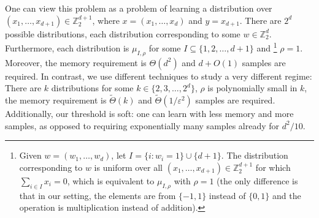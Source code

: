 \documentclass[final, 12pt]{colt2018}
\begin{document}
One can view this problem as a problem of learning a distribution over 
$\left(x_1, \dots, x_{d+1}\right) \in \mathbb{Z}_2^{d+1}$, where $x = 
(x_1,\dots, x_d)$ and $y = x_{d+1}$. There are $2^d$ possible distributions, 
each distribution corresponding to some $w \in \mathbb{Z}_2^d$. Furthermore, 
each distribution is $\mu_{I,\rho}$ for some $I \subseteq \{1,2,\dots,d+1\}$ 
and \footnote{Given $w = (w_1, \dots, w_d)$, let $I = \{ i \colon w_i = 1\} 
\cup \{d+1\}$. The distribution corresponding to $w$ is uniform over all 
$(x_1,\dots,x_{d+1}) \in \mathbb{Z}_2^{d+1}$ for which $\sum_{i \in I} x_i = 
0$, which is equivalent to $\mu_{I,\rho}$ with $\rho = 1$ (the only difference 
is that in our setting, the elements are from $\{-1,1\}$ instead of $\{0,1\}$ 
and the operation is multiplication instead of addition).} $\rho = 1$. 
Moreover, the memory requirement is $\Theta(d^2)$ and $d + O(1)$ samples are 
required. In contrast, we use different techniques to study a very different 
regime: There are $k$ distributions for some $k \in \{2, 3, \dots, 2^d\}$, 
$\rho$ is polynomially small in $k$, the memory requirement is 
$\tilde\Theta(k)$ and $\tilde\Theta(1/\varepsilon^2)$ samples are required. 
Additionally, our threshold is soft: one can learn with less memory and more 
samples, as opposed to requiring exponentially many samples already for 
$d^2/10$.
\end{document}
